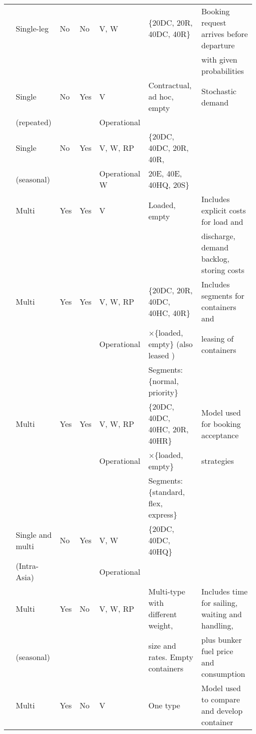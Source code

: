 {\begin{landscape}
\begin{table}[width=0.95\linewidth,cols=7,pos=p]
\begin{footnotesize}
\begin{threeparttable}
\begin{tabular*}{\tblwidth}{@{} *{7}{L} @{}}
\citet{Bingzhou08}	& Single-leg 			& No 		& No	& V, W			& \{20DC, 20R, 40DC, 40R\}		& Booking request arrives before departure\\
					&						& 			&			& 				& 										& with given probabilities\\
\citet{Zou08}		& Single 				& No 		& Yes		& V				& Contractual, ad hoc, empty 			& Stochastic demand\\
					& (repeated) 			& 			&			& Operational	& 										&\\
\citet{Lu10}		& Single 				& No 		& Yes		& V, W, RP		& \{20DC, 40DC, 20R, 40R,				&\\
					& (seasonal) 			& 			& 			& Operational W & 20E, 40E, 40HQ, 20S\}					&\\
\citet{Song12}		& Multi 				&Yes	& Yes		& V       		& Loaded, empty							& Includes explicit costs for load and \\
					&						& 			&			& 				& 										& discharge, demand backlog, storing costs\\
\citet{Zurheide12}	& Multi 				&Yes	& Yes		& V, W, RP		& \{20DC, 20R, 40DC, 40HC, 40R\} 		& Includes segments for containers and \\
					&						&			&			& Operational	& $\times$\{loaded, empty\} (also leased )& leasing of containers \\
					&						&			&			&				& Segments: \{normal, priority\}		&\\
\citet{Zurheide15}	& Multi 				&Yes	& Yes		& V, W, RP		& \{20DC, 40DC, 40HC, 20R, 40HR\}		& Model used for booking acceptance \\
					&						&			&			&	Operational	& $\times$\{loaded, empty\}				& strategies\\
					&						&			&			&				&  Segments: \{standard, flex, express\}&\\
\citet{Chang15}		& Single and multi 		& No 		& Yes		& V, W    		& \{20DC, 40DC, 40HQ\} 					&\\
					& (Intra-Asia) 			& 			& 			& Operational	& 										&\\
\citet{Wang15b}		& Multi 				& Yes 		& No\tn{2}	& V, W, RP& Multi-type with different weight,	 	& Includes time for sailing, waiting and handling, \\
					& (seasonal) 			&  			& 			& 				& size and rates. Empty containers& plus bunker fuel price and consumption\\
\citet{Zhen17}		& Multi 				& Yes		& No		& V				& One type								& Model used to compare and develop container\\

\end{tabular*}
\end{threeparttable}
\end{footnotesize}
\end{table}
\end{landscape}}
